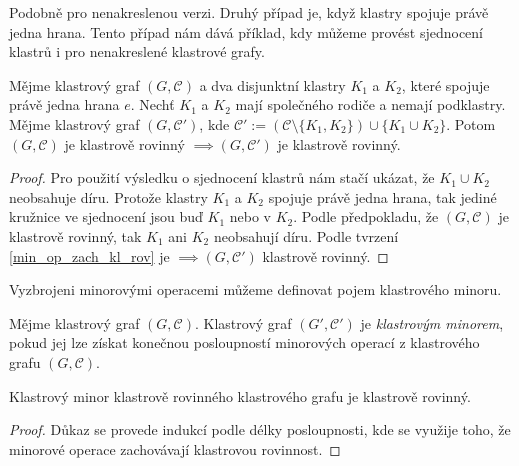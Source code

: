 Podobně pro nenakreslenou verzi. Druhý případ je, když klastry spojuje právě jedna hrana. Tento případ nám dává příklad, kdy můžeme provést sjednocení klastrů i pro nenakreslené klastrové grafy.
\begin{tvr}
Mějme klastrový graf  $(G, \mathcal C)$ a dva disjunktní klastry $K_1$ a $K_2$, které spojuje právě jedna hrana $e$. Nechť $K_1$ a $K_2$ mají společného rodiče a nemají podklastry. Mějme klastrový graf $(G, \mathcal C')$, kde  $\mathcal C'  := (\mathcal C \setminus \{K_1,K_2\}) \cup \{K_1 \cup K_2\}$. Potom $(G, \mathcal C)$ je klastrově rovinný $\implies (G, \mathcal C')$ je klastrově rovinný.
\end{tvr}
\begin{proof}
Pro použití výsledku o sjednocení klastrů nám stačí ukázat, že $K_1 \cup K_2$ neobsahuje díru. Protože klastry $K_1$ a $K_2$ spojuje právě jedna hrana, tak jediné kružnice ve sjednocení jsou buď $K_1$ nebo v $K_2$. Podle předpokladu, že $(G, \mathcal C)$ je klastrově rovinný, tak $K_1$ ani $K_2$ neobsahují díru. Podle tvrzení \ref{min_op_zach_kl_rov} je $\implies (G, \mathcal C')$ klastrově rovinný.
\end{proof}

Vyzbrojeni minorovými operacemi můžeme definovat pojem klastrového minoru.

\begin{defn}
Mějme klastrový graf $(G,\mathcal C)$. Klastrový graf $(G',\mathcal C')$ je \textit{klastrovým minorem}, pokud jej lze získat konečnou posloupností minorových operací z klastrového grafu $(G,\mathcal C)$.
\end{defn}

\begin{dusl} Klastrový minor klastrově rovinného klastrového grafu je klastrově rovinný.
\label{důsledek}
\end{dusl}
\begin{proof}
Důkaz se provede indukcí podle délky posloupnosti, kde se využije toho, že minorové operace zachovávají klastrovou rovinnost.
\end{proof}